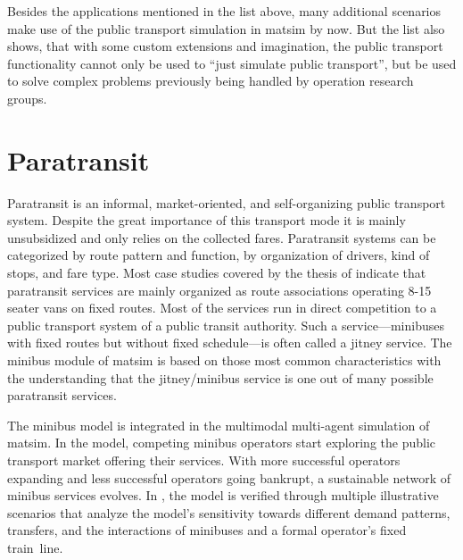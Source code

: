 Besides the applications mentioned in the list above, many additional scenarios
make use of the public transport simulation in \gls{matsim} by now. But the list also
shows, that with some custom extensions and imagination, the public transport
functionality cannot only be used to ``just simulate public transport'', but be
used to solve complex problems previously being handled by operation research
groups.

\section{Paratransit}
\label{sec:paratransit}
Paratransit is an informal, market-oriented, and self-organizing public transport system. 
Despite the great importance of this transport mode it is mainly unsubsidized and only relies on the collected fares. 
Paratransit systems can be categorized by route pattern and function, by organization of drivers, kind of stops, and fare type. 
Most case studies covered by the thesis of \citet[][]{Neumann_PhDThesis_2014} indicate that paratransit services are mainly 
organized as route associations operating 8-15\,seater vans on fixed routes. Most of the services run in direct competition to a
public transport system of a public transit authority. Such a service---minibuses with fixed routes but without fixed schedule---is often called a jitney service.
The minibus module of \gls{matsim} is based on those most common characteristics with the understanding that the jitney/minibus
service is one out of many possible paratransit services.

The minibus model is integrated in the \gls{multimodal} multi-agent simulation of \gls{matsim}. In the model, competing minibus operators start exploring the public transport market offering their services. With more successful operators expanding and less successful operators going bankrupt, a sustainable network of minibus services evolves. In \citet[][]{Neumann_PhDThesis_2014}, the model is verified through multiple illustrative scenarios that analyze the model's sensitivity towards different demand patterns, transfers, and the interactions of minibuses and a formal operator's fixed train~line.

